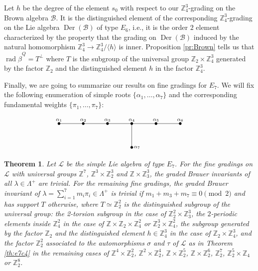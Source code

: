 \documentclass[a4paper,reqno]{amsart}
\newtheorem{theorem}{Theorem}
\theoremstyle{definition}
\numberwithin{theorem}{section}
\numberwithin{equation}{section}
\begin{document}
Let $h$ be the degree of the element $s_0$ with respect to our ${\mathbb{Z}}_4^3$-grading on the Brown algebra ${\mathcal{B}}$. It is the distinguished element of the corresponding ${\mathbb{Z}}_4^3$-grading on the Lie algebra $\operatorname{\mathrm{Der}}({\mathcal{B}})$ of type $E_6$, i.e., it is the order $2$ element characterized by the property that the grading on $\operatorname{\mathrm{Der}}({\mathcal{B}})$ induced by the natural homomorphism ${\mathbb{Z}}_4^3\to{\mathbb{Z}}_4^3/\langle h\rangle$ is inner. Proposition \ref{pr:Brown} tells us that $\operatorname{\mathrm{rad}}\hat\beta^Q=T^\perp$ where $T$ is the subgroup of the universal group ${\mathbb{Z}}_2\times{\mathbb{Z}}_4^3$ generated by the factor ${\mathbb{Z}}_2$ and the distinguished element $h$ in the factor ${\mathbb{Z}}_4^3$.

\medskip

Finally, we are going to summarize our results on fine gradings for $E_7$. We will fix the following enumeration of simple roots $\{\alpha_1,\ldots,\alpha_7\}$ and the corresponding fundamental weights $\{{\pi}_1,\ldots,{\pi}_7\}$:

\[\xymatrix{
\bullet\ar@{-}[]+0;[r]+0^<{\alpha_1}  & \bullet\ar@{-}[]+0;[r]+0^<{\alpha_2} & \bullet\ar@{-}[]+0;[r]+0^<{\alpha_3} & \bullet\ar@{-}[]+0;[r]+0^<{\alpha_4}\ar@{-}[]+0;[d]+0^>{\alpha_7}  & \bullet\ar@{-}[]+0;[r]+0^<{\alpha_5} & \bullet\ar@{}[]+0;[r]^<{\alpha_6} & \\
& & & \bullet & &
}
\]

\begin{theorem}\label{th:E7}
Let ${\mathcal{L}}$ be the simple Lie algebra of type $E_7$. For the fine gradings on ${\mathcal{L}}$ with universal groups ${\mathbb{Z}}^7$, ${\mathbb{Z}}^3\times{\mathbb{Z}}_2^3$ and ${\mathbb{Z}}\times{\mathbb{Z}}_3^3$, the graded Brauer invariants of all $\lambda\in\Lambda^+$ are trivial. For the remaining fine gradings, the graded Brauer invariant of $\lambda=\sum_{i=1}^7 m_i{\pi}_i\in\Lambda^+$ is trivial if $m_1+m_3+m_7\equiv 0\pmod{2}$ and has support $T$ otherwise, where $T\simeq{\mathbb{Z}}_2^2$ is the distinguished subgroup of the universal group: the 2-torsion subgroup in the case of ${\mathbb{Z}}_2^2\times{\mathbb{Z}}_3^3$, the $2$-periodic elements inside ${\mathbb{Z}}_4^2$ in the case of ${\mathbb{Z}}\times{\mathbb{Z}}_2\times{\mathbb{Z}}_4^2$ or ${\mathbb{Z}}_2^3\times{\mathbb{Z}}_4^2$, the subgroup generated by the factor ${\mathbb{Z}}_2$ and the distinguished element $h\in{\mathbb{Z}}_4^3$ in the case of ${\mathbb{Z}}_2\times{\mathbb{Z}}_4^3$, and the factor ${\mathbb{Z}}_2^2$ associated to the automorphisms $\sigma$ and $\tau$ of ${\mathcal{L}}$ as in Theorem \ref{th:e7c4} in the remaining cases of ${\mathbb{Z}}^4\times{\mathbb{Z}}_2^2$,  ${\mathbb{Z}}^2\times{\mathbb{Z}}_2^4$, ${\mathbb{Z}}\times{\mathbb{Z}}_2^5$, ${\mathbb{Z}}\times{\mathbb{Z}}_2^6$, ${\mathbb{Z}}_2^7$, ${\mathbb{Z}}_2^5\times{\mathbb{Z}}_4$ or ${\mathbb{Z}}_2^8$.
\end{theorem}
\end{document}
